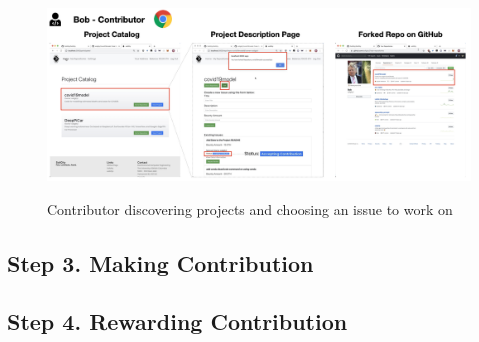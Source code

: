 \documentclass[12pt]{article}
\renewcommand{\_}{\kern-1.5pt\textunderscore\kern-1.5pt}
\begin{document}
     \begin{figure}[H]
    	\centering
        \includegraphics[width=16.5cm]{graphs/52. discover_1.png}\\
    	\caption{Contributor discovering projects and choosing an issue to work on}
    	\label{fig:discover1}
    \end{figure}


\subsection*{Step 3. Making Contribution}


\subsection*{Step 4. Rewarding Contribution}
















\end{document}
